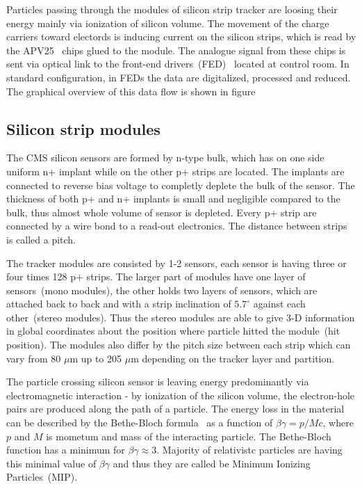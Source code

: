 Particles passing through the modules of silicon strip tracker are loosing their energy mainly via ionization of silicon volume. The movement of the charge carriers toward electords is inducing current on the silicon strips, which is read by the APV25~\cite{French:2001xb} chips glued to the module. The analogue signal from these chips is sent via optical link to the front-end drivers~(FED)~\cite{Baird:2002wg} located at control room. In standard configuration, in FEDs the data are digitalized, processed and reduced. The graphical overview of this data flow is shown in figure~

\subsection{Silicon strip modules}

The CMS silicon sensors are formed by n-type bulk, which has on one side uniform n+ implant while on the other p+ strips are located. The implants are connected to reverse bias voltage to completly deplete the bulk of the sensor. The thickness of both p+ and n+ implants is small and negligible compared to the bulk, thus almost whole volume of sensor is depleted. Every p+ strip are connected by a wire bond to a read-out electronics. The distance between strips is called a pitch.

The tracker modules are consisted by 1-2 sensors, each sensor is having three or four times 128 p+ strips. The larger part of modules have one layer of sensors~(mono modules), the other holds two layers of sensors, which are attached back to back and with a strip inclination of $5.7^{\circ}$ against each other~(stereo modules). Thus the stereo modules are able to give 3-D information in global coordinates about the position where particle hitted the module~(hit position). The modules also differ by the pitch size between each strip which can vary from 80 $\mu$m up to 205 $\mu$m depending on the tracker layer and partition.

The particle crossing silicon sensor is leaving energy predominantly via electromagnetic interaction - by ionization of the silicon volume, the electron-hole pairs are produced along the path of a particle. The energy loss in the material can be described by the Bethe-Bloch formula~\cite{Groom:2000sm} as a function of $\beta\gamma = p/Mc$, where $p$ and $M$ is mometum and mass of the interacting particle. The Bethe-Bloch function has a minimum for $\beta\gamma \approx 3$. Majority of relativistc particles are having this minimal value of $\beta\gamma$ and thus they are called be Minimum Ionizing Particles~(MIP).


